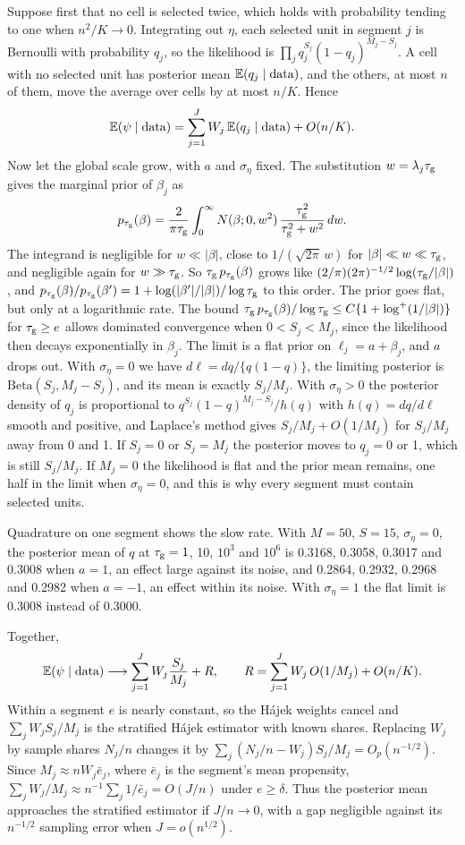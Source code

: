 Suppose first that no cell is selected twice, which holds with probability tending to one when $n^2/K \to 0$. Integrating out $\eta$, each selected unit in segment $j$ is Bernoulli with probability $q_j$, so the likelihood is $\prod_j q_j^{S_j}(1 - q_j)^{M_j - S_j}$. A cell with no selected unit has posterior mean $\mathbb{E}(q_j \mid \text{data})$, and the others, at most $n$ of them, move the average over cells by at most $n/K$. Hence
\[
\mathbb{E}(\psi \mid \text{data}) = \sum_{j=1}^J W_j\,\mathbb{E}(q_j \mid \text{data}) + O(n/K).
\]
Now let the global scale grow, with $a$ and $\sigma_\eta$ fixed. The substitution $w = \lambda_j\tau_{\mathrm{g}}$ gives the marginal prior of $\beta_j$ as
\[
p_{\tau_{\mathrm{g}}}(\beta) = \frac{2}{\pi\tau_{\mathrm{g}}}\int_0^\infty N(\beta; 0, w^2)\,\frac{\tau_{\mathrm{g}}^2}{\tau_{\mathrm{g}}^2 + w^2}\,dw.
\]
The integrand is negligible for $w \ll |\beta|$, close to $1/(\sqrt{2\pi}\,w)$ for $|\beta| \ll w \ll \tau_{\mathrm{g}}$, and negligible again for $w \gg \tau_{\mathrm{g}}$. So $\tau_{\mathrm{g}}\,p_{\tau_{\mathrm{g}}}(\beta)$ grows like $(2/\pi)(2\pi)^{-1/2}\log(\tau_{\mathrm{g}}/|\beta|)$, and $p_{\tau_{\mathrm{g}}}(\beta)/p_{\tau_{\mathrm{g}}}(\beta') = 1 + \log(|\beta'|/|\beta|)/\log\tau_{\mathrm{g}}$ to this order. The prior goes flat, but only at a logarithmic rate. The bound $\tau_{\mathrm{g}}\,p_{\tau_{\mathrm{g}}}(\beta)/\log\tau_{\mathrm{g}} \leq C\{1 + \log^+(1/|\beta|)\}$ for $\tau_{\mathrm{g}} \geq e$ allows dominated convergence when $0 < S_j < M_j$, since the likelihood then decays exponentially in $\beta_j$. The limit is a flat prior on $\ell_j = a + \beta_j$, and $a$ drops out. With $\sigma_\eta = 0$ we have $d\ell = dq/\{q(1 - q)\}$, the limiting posterior is $\mathrm{Beta}(S_j, M_j - S_j)$, and its mean is exactly $S_j/M_j$. With $\sigma_\eta > 0$ the posterior density of $q_j$ is proportional to $q^{S_j}(1 - q)^{M_j - S_j}/h(q)$ with $h(q) = dq/d\ell$ smooth and positive, and Laplace's method gives $S_j/M_j + O(1/M_j)$ for $S_j/M_j$ away from 0 and 1. If $S_j = 0$ or $S_j = M_j$ the posterior moves to $q_j = 0$ or 1, which is still $S_j/M_j$. If $M_j = 0$ the likelihood is flat and the prior mean remains, one half in the limit when $\sigma_\eta = 0$, and this is why every segment must contain selected units.

Quadrature on one segment shows the slow rate. With $M = 50$, $S = 15$, $\sigma_\eta = 0$, the posterior mean of $q$ at $\tau_{\mathrm{g}} = 1$, 10, $10^3$ and $10^6$ is 0.3168, 0.3058, 0.3017 and 0.3008 when $a = 1$, an effect large against its noise, and 0.2864, 0.2932, 0.2968 and 0.2982 when $a = -1$, an effect within its noise. With $\sigma_\eta = 1$ the flat limit is 0.3008 instead of 0.3000.

Together,
\[
\mathbb{E}(\psi \mid \text{data}) \longrightarrow \sum_{j=1}^J W_j\frac{S_j}{M_j} + R, \qquad R = \sum_{j=1}^J W_j\,O(1/M_j) + O(n/K).
\]
Within a segment $e$ is nearly constant, so the H\'ajek weights cancel and $\sum_jW_jS_j/M_j$ is the stratified H\'ajek estimator with known shares. Replacing $W_j$ by sample shares $N_j/n$ changes it by $\sum_j(N_j/n-W_j)S_j/M_j=O_p(n^{-1/2})$. Since $M_j\approx nW_j\bar e_j$, where $\bar e_j$ is the segment's mean propensity, $\sum_jW_j/M_j\approx n^{-1}\sum_j1/\bar e_j=O(J/n)$ under $e\ge\delta$. Thus the posterior mean approaches the stratified estimator if $J/n\to0$, with a gap negligible against its $n^{-1/2}$ sampling error when $J=o(n^{1/2})$.

